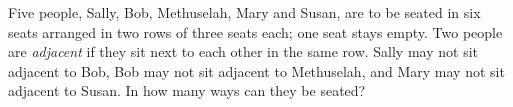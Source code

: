 Five people, Sally, Bob, Methuselah, Mary and Susan, are to be seated in six seats arranged in two rows of three seats each; one seat stays empty. Two people are \emph{adjacent} if they sit next to each other in the same row. Sally may not sit adjacent to Bob, Bob may not sit adjacent to Methuselah, and Mary may not sit adjacent to Susan. In how many ways can they be seated?
